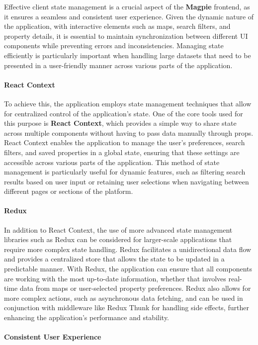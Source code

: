     Effective client state management is a crucial aspect of the \textbf{Magpie} frontend, as it ensures a seamless and consistent user experience. Given the dynamic nature of the application, with interactive elements such as maps, search filters, and property details, it is essential to maintain synchronization between different UI components while preventing errors and inconsistencies. Managing state efficiently is particularly important when handling large datasets that need to be presented in a user{-}friendly manner across various parts of the application.
    \paragraph{React Context}\mbox{}

    To achieve this, the application employs state management techniques that allow for centralized control of the application’s state. One of the core tools used for this purpose is \textbf{React Context}, which provides a simple way to share state across multiple components without having to pass data manually through props. React Context enables the application to manage the user’s preferences, search filters, and saved properties in a global state, ensuring that these settings are accessible across various parts of the application. This method of state management is particularly useful for dynamic features, such as filtering search results based on user input or retaining user selections when navigating between different pages or sections of the platform.
    \paragraph{Redux}\mbox{}

    In addition to React Context, the use of more advanced state management libraries such as Redux can be considered for larger{-}scale applications that require more complex state handling. Redux facilitates a unidirectional data flow and provides a centralized store that allows the state to be updated in a predictable manner. With Redux, the application can ensure that all components are working with the most up{-}to{-}date information, whether that involves real{-}time data from maps or user{-}selected property preferences. Redux also allows for more complex actions, such as asynchronous data fetching, and can be used in conjunction with middleware like Redux Thunk for handling side effects, further enhancing the application’s performance and stability.
    \paragraph{Consistent User Experience}\mbox{}

